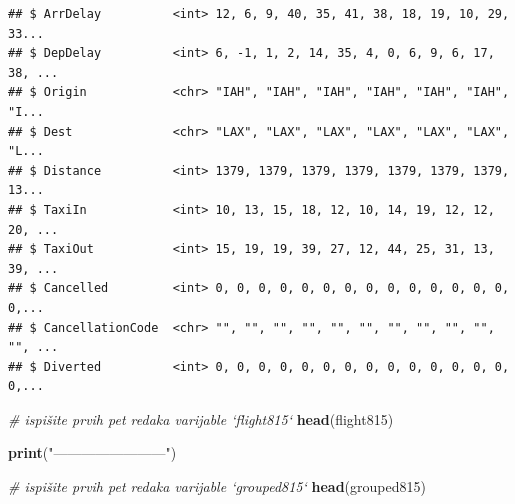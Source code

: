 \documentclass[]{book}
\newenvironment{Shaded}{\begin{snugshade}}{\end{snugshade}}
\newcommand{\KeywordTok}[1]{\textcolor[rgb]{0.13,0.29,0.53}{\textbf{#1}}}
\newcommand{\StringTok}[1]{\textcolor[rgb]{0.31,0.60,0.02}{#1}}
\newcommand{\CommentTok}[1]{\textcolor[rgb]{0.56,0.35,0.01}{\textit{#1}}}
\newcommand{\NormalTok}[1]{#1}
\theoremstyle{definition}
\theoremstyle{definition}
\theoremstyle{definition}
\theoremstyle{remark}
\begin{document}
\begin{verbatim}
## $ ArrDelay          <int> 12, 6, 9, 40, 35, 41, 38, 18, 19, 10, 29, 33...
## $ DepDelay          <int> 6, -1, 1, 2, 14, 35, 4, 0, 6, 9, 6, 17, 38, ...
## $ Origin            <chr> "IAH", "IAH", "IAH", "IAH", "IAH", "IAH", "I...
## $ Dest              <chr> "LAX", "LAX", "LAX", "LAX", "LAX", "LAX", "L...
## $ Distance          <int> 1379, 1379, 1379, 1379, 1379, 1379, 1379, 13...
## $ TaxiIn            <int> 10, 13, 15, 18, 12, 10, 14, 19, 12, 12, 20, ...
## $ TaxiOut           <int> 15, 19, 19, 39, 27, 12, 44, 25, 31, 13, 39, ...
## $ Cancelled         <int> 0, 0, 0, 0, 0, 0, 0, 0, 0, 0, 0, 0, 0, 0, 0,...
## $ CancellationCode  <chr> "", "", "", "", "", "", "", "", "", "", "", ...
## $ Diverted          <int> 0, 0, 0, 0, 0, 0, 0, 0, 0, 0, 0, 0, 0, 0, 0,...
\end{verbatim}

\begin{Shaded}
\begin{Highlighting}[]
\CommentTok{# ispišite prvih pet redaka varijable `flight815` }
\KeywordTok{head}\NormalTok{(flight815)}

\KeywordTok{print}\NormalTok{(}\StringTok{"------------------------"}\NormalTok{)   }

\CommentTok{# ispišite prvih pet redaka varijable `grouped815` }
\KeywordTok{head}\NormalTok{(grouped815)}
\end{Highlighting}
\end{Shaded}
\end{document}
